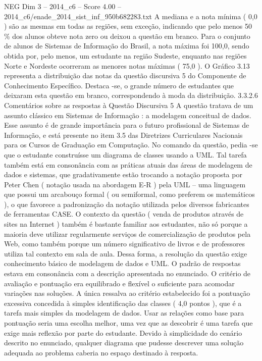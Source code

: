 \begin{textsample}{NEG Dim 3 – 2014\_c6 – Score 4.00 – 2014\_c6/enade\_2014\_sist\_inf\_950b682283.txt}
A mediana e a nota mínima ( 0,0 ) são as mesmas em todas as regiões, sem exceção, indicando que pelo menos 50 \% dos alunos obteve nota zero ou deixou a questão em branco.
Para o conjunto de alunos de Sistemas de Informação do Brasil, a nota máxima foi 100,0, sendo obtida por, pelo menos, um estudante na região Sudeste, enquanto nas regiões Norte e Nordeste ocorreram as menores notas máximas ( 75,0 ).
O Gráfico 3.13 representa a distribuição das notas da questão discursiva 5 do Componente de Conhecimento Específico.
Destaca -se, o grande número de estudantes que deixaram esta questão em branco, correspondendo à moda da distribuição. 3.3.2.6 Comentários sobre as respostas à Questão Discursiva 5 A questão tratava de um assunto clássico em Sistemas de Informação : a modelagem conceitual de dados.
Esse assunto é de grande importância para o futuro profissional de Sistemas de Informação, e está presente no item 3.5 das Diretrizes Curriculares Nacionais para os Cursos de Graduação em Computação.
No comando da questão, pedia -se que o estudante construísse um diagrama de classes usando a UML.
Tal tarefa também está em consonância com as práticas atuais das áreas de modelagem de dados e sistemas, que gradativamente estão trocando a notação proposta por Peter Chen ( notação usada na abordagem E-R ) pela UML – uma linguagem que possui um arcabouço formal ( ou semiformal, como preferem os matemáticos ), o que favorece a padronização da notação utilizada pelos diversos fabricantes de ferramentas CASE.
O contexto da questão ( venda de produtos através de sites na Internet ) também é bastante familiar aos estudantes, não só porque a maioria deve utilizar regularmente serviços de comercialização de produtos pela Web, como também porque um número significativo de livros e de professores utiliza tal contexto em sala de aula.
Dessa forma, a resolução da questão exige conhecimento básico de modelagem de dados e UML.
O padrão de respostas estava em consonância com a descrição apresentada no enunciado.
O critério de avaliação e pontuação era equilibrado e flexível o suficiente para acomodar variações nas soluções.
A única ressalva ao critério estabelecido foi a pontuação excessiva concedida à simples identificação das classes ( 4,0 pontos ), que é a tarefa mais simples da modelagem de dados.
Usar as relações como base para pontuação seria uma escolha melhor, uma vez que as descobrir é uma tarefa que exige mais reflexão por parte do estudante.
Devido à simplicidade do cenário descrito no enunciado, qualquer diagrama que pudesse descrever uma solução adequada ao problema caberia no espaço destinado à resposta.

\end{textsample}
